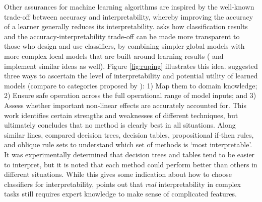 Other assurances for machine learning algorithms are inspired by the well-known trade-off between accuracy and interpretability, whereby improving the accuracy of a learner generally reduces its interpretability. \citet{Ruping2006-xj} asks how classification results and the accuracy-interpretability trade-off can be made more transparent to those who design and use classifiers, by combining simpler global models with more complex local models that are built around learning results (\citet{Otte2013-oo} and \citet{Ribeiro2016-uc} implement similar ideas as well). 
Figure \ref{fig:ruping} illustrates this idea. 
\citet{Van_Belle2013-ph} suggested three ways to ascertain the level of interpretability and potential utility of learned models (compare to categories proposed by \citet{Lipton2016-ug}): 1) Map them to domain knowledge; 2) Ensure safe operation across the full operational range of model inputs; and 3) Assess whether important non-linear effects are accurately accounted for. 
This work identifies certain strengths and weaknesses of different techniques, but ultimately concludes that no method is clearly best in all situations. 
Along similar lines, \citet{Huysmans2011-th} compared decision trees, decision tables, propositional if-then rules, and oblique rule sets to understand which set of methods is `most interpretable'. 
It was experimentally determined that decision trees and tables tend to be easier to interpret, but it is noted that each method could perform better than others in different situations. 
While this gives some indication about how to choose classifiers for interpretability, \citeauthor{Park2016-ld} %
points out that \emph{real} interpretability in complex tasks still requires expert knowledge to make sense of complicated features. 
